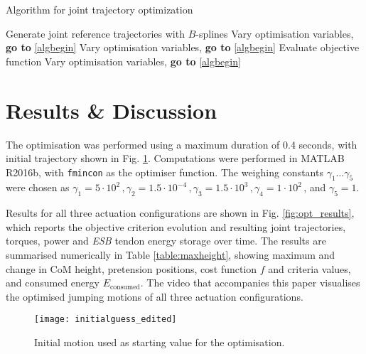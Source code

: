 \documentclass[letterpaper, 10 pt, conference]{ieeeconf}  %
\begin{document}
\begin{algorithm}[ht]
	\caption{Algorithm for joint trajectory optimization} \label{algo}
	\begin{algorithmic}[1]
		\STATE Generate joint reference trajectories with $B$-splines \label{algbegin}
		\ELSE
			\STATE Vary optimisation variables, \textbf{go to} \ref{algbegin}
		\ENDIF
		\ENDWHILE
		\ELSE
			\STATE Vary optimisation variables, \textbf{go to} \ref{algbegin}
		\ENDIF
		\STATE Evaluate objective function
		\ELSE
			\STATE Vary optimisation variables, \textbf{go to} \ref{algbegin}
		\ENDIF
	\end{algorithmic}
\end{algorithm}


\section{Results \& Discussion} \label{sec:results}
The optimisation was performed using a maximum duration of 0.4 seconds, with initial trajectory shown in Fig. \ref{fig:seq}. Computations were performed in MATLAB R2016b, with \texttt{fmincon} as the optimiser function. The weighing constants $\gamma_1 \dots \gamma_5$ were chosen as $\gamma_1=5 \cdot 10^{2} \,, \gamma_2=1.5 \cdot 10^{-4} \,, \gamma_3=1.5 \cdot 10^{3} \,, \gamma_4 = 1\cdot 10^{2}\,$, and $\gamma_5 = 1$.

Results for all three actuation configurations are shown in Fig. \ref{fig:opt_results}, which reports the objective criterion evolution and resulting joint trajectories, torques, power and \textit{ESB} tendon energy storage over time. The results are summarised numerically in Table \ref{table:maxheight}, showing maximum and change in CoM height, pretension positions, cost function $f$ and criteria values, and consumed energy $E_{\text{consumed}}$. The video that accompanies this paper visualises the optimised jumping motions of all three actuation configurations.

\begin{figure}[ht]
	\centering
	{\texttt{[image: initialguess\_edited]}
	}%
	\caption{Initial motion used as starting value for the optimisation.}
	\label{fig:seq}	
\end{figure}
\end{document}
